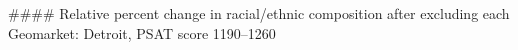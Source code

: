 #### Relative percent change in racial/ethnic composition after excluding each Geomarket: Detroit, PSAT score 1190–1260
